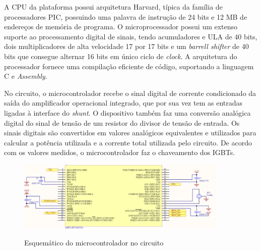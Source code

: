A CPU da plataforma possui arquitetura Harvard, típica da família de processadores PIC, possuindo uma palavra de instrução de 24 bits e 12 MB de endereços de memória de programa. O microprocessador possui um extenso suporte ao processamento digital de sinais, tendo acumuladores e ULA de 40 bits, dois multiplicadores de alta velocidade 17 por 17 bits e um \textit{barrell shifter} de 40 bits que consegue alternar 16 bits em único ciclo de \textit{clock}. A arquitetura do processador fornece uma compilação eficiente de código, suportando a linguagem C e \textit{Assembly}.

No circuito, o microcontrolador recebe o sinal digital de corrente  condicionado da saída do amplificador operacional integrado, que por sua vez tem as entradas ligadas à interface do \textit{shunt}. O dispositivo também faz uma conversão analógica digital do sinal de tensão de um resistor do divisor de tensão de entrada. Os sinais digitais são convertidos em valores analógicos equivalentes e utilizados para calcular a potência utilizada e a corrente total utilizada pelo circuito. De acordo com os valores medidos, o microcontrolador faz o chaveamento dos IGBTs.

\begin{figure}[H]
    \centering
    \caption{Esquemático do microcontrolador no circuito}
    \includegraphics[width=0.9\textwidth]{./dados/figuras/proj-uc}
    \label{fig:figura-dspic}
\end{figure}



